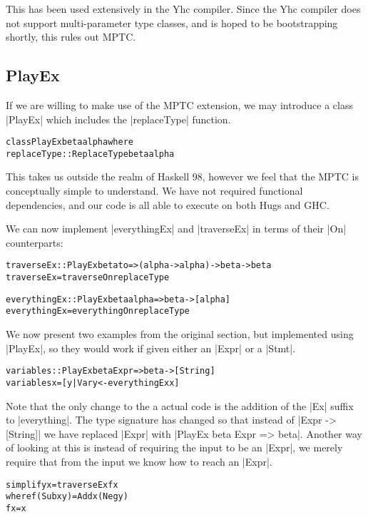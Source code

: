 \documentclass[preprint]{sigplanconf}
\newenvironment{code}{\begin{alltt}\small}{\end{alltt}}
\begin{document}
This has been used extensively in the Yhc compiler. Since the Yhc compiler does not support multi-parameter type classes, and is hoped to be bootstrapping shortly, this rules out MPTC.

\subsection{PlayEx}

If we are willing to make use of the MPTC extension, we may introduce a class |PlayEx| which includes the |replaceType| function.

\begin{code}
class  PlayEx beta alpha where
       replaceType :: ReplaceType beta alpha
\end{code}

This takes us outside the realm of Haskell 98, however we feel that the MPTC is conceptually simple to understand. We have not required functional dependencies, and our code is all able to execute on both Hugs and GHC.

We can now implement |everythingEx| and |traverseEx| in terms of their |On| counterparts:

\begin{code}
traverseEx :: PlayEx beta to => (alpha -> alpha) -> beta -> beta
traverseEx = traverseOn replaceType

everythingEx :: PlayEx beta alpha => beta -> [alpha]
everythingEx = everythingOn replaceType
\end{code}

We now present two examples from the original section, but implemented using |PlayEx|, so they would work if given either an |Expr| or a |Stmt|.

\begin{code}
variables :: PlayEx beta Expr => beta -> [String]
variables x = [y | Var y <- everythingEx x]
\end{code}

Note that the only change to the a actual code is the addition of the |Ex| suffix to |everything|. The type signature has changed so that instead of |Expr -> [String]| we have replaced |Expr| with |PlayEx beta Expr => beta|. Another way of looking at this is instead of requiring the input to be an |Expr|, we merely require that from the input we know how to reach an |Expr|.

\begin{code}
simplify x = traverseEx f x
    where  f (Sub x y)  = Add x (Neg y)
           f x          = x
\end{code}
\end{document}
